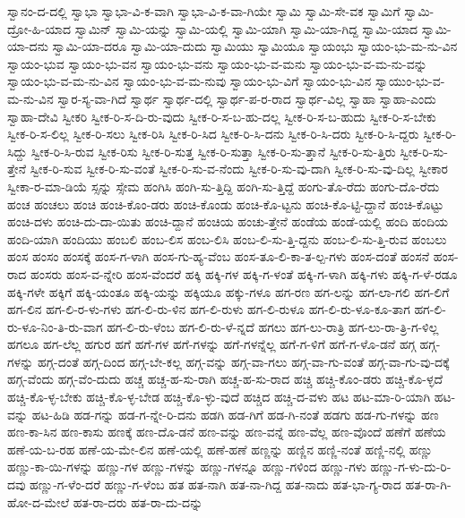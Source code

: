 {ಸ್ವಾನಂ-ದ-ದಲ್ಲಿ
ಸ್ವಾಭಾ
ಸ್ವಾಭಾ-ವಿ-ಕ-ವಾಗಿ
ಸ್ವಾಭಾ-ವಿ-ಕ-ವಾ-ಗಿಯೇ
ಸ್ವಾಮಿ
ಸ್ವಾಮಿ-ಸೇ-ವಕ
ಸ್ವಾಮಿಗೆ
ಸ್ವಾಮಿ-ದ್ರೋ-ಹಿ-ಯಾದ
ಸ್ವಾಮಿನ್
ಸ್ವಾಮಿ-ಯನ್ನು
ಸ್ವಾಮಿ-ಯಲ್ಲಿ
ಸ್ವಾಮಿ-ಯಾಗಿ
ಸ್ವಾಮಿ-ಯಾ-ಗಿದ್ದ
ಸ್ವಾಮಿ-ಯಾದ
ಸ್ವಾಮಿ-ಯಾ-ದನು
ಸ್ವಾಮಿ-ಯಾ-ದರೂ
ಸ್ವಾಮಿ-ಯಾ-ದುದು
ಸ್ವಾಮಿಯು
ಸ್ವಾಮಿಯೂ
ಸ್ವಾಯಂಭು
ಸ್ವಾಯಂ-ಭು-ಮ-ನು-ವಿನ
ಸ್ವಾಯಂ-ಭುವ
ಸ್ವಾಯಂ-ಭು-ವನ
ಸ್ವಾಯಂ-ಭು-ವನು
ಸ್ವಾಯಂ-ಭು-ವ-ಮನು
ಸ್ವಾಯಂ-ಭು-ವ-ಮ-ನು-ವನ್ನು
ಸ್ವಾಯಂ-ಭು-ವ-ಮ-ನು-ವಿನ
ಸ್ವಾಯಂ-ಭು-ವ-ಮ-ನುವು
ಸ್ವಾಯಂ-ಭು-ವಿಗೆ
ಸ್ವಾಯಂ-ಭು-ವಿನ
ಸ್ವಾಯುಂ-ಭು-ವ-ಮ-ನು-ವಿನ
ಸ್ವಾರ-ಸ್ಯ-ವಾ-ಗಿದೆ
ಸ್ವಾರ್ಥ
ಸ್ವಾರ್ಥ-ದಲ್ಲಿ
ಸ್ವಾರ್ಥ-ಪ-ರ-ರಾದ
ಸ್ವಾರ್ಥ-ವಿಲ್ಲ
ಸ್ವಾಹಾ
ಸ್ವಾಹಾ-ಎಂದು
ಸ್ವಾಹಾ-ದೇವಿ
ಸ್ವೀಕರಿ
ಸ್ವೀಕ-ರಿ-ಸ-ದಿ-ರು-ವುದು
ಸ್ವೀಕ-ರಿ-ಸ-ಬ-ಹು-ದಲ್ಲ
ಸ್ವೀಕ-ರಿ-ಸ-ಬ-ಹುದು
ಸ್ವೀಕ-ರಿ-ಸ-ಬೇಕು
ಸ್ವೀಕ-ರಿ-ಸ-ಲಿಲ್ಲ
ಸ್ವೀಕ-ರಿ-ಸಲು
ಸ್ವೀಕ-ರಿಸಿ
ಸ್ವೀಕ-ರಿ-ಸಿದ
ಸ್ವೀಕ-ರಿ-ಸಿ-ದನು
ಸ್ವೀಕ-ರಿ-ಸಿ-ದರು
ಸ್ವೀಕ-ರಿ-ಸಿ-ದ್ದರು
ಸ್ವೀಕ-ರಿ-ಸಿದ್ದು
ಸ್ವೀಕ-ರಿ-ಸಿ-ರುವ
ಸ್ವೀಕ-ರಿಸು
ಸ್ವೀಕ-ರಿ-ಸುತ್ತ
ಸ್ವೀಕ-ರಿ-ಸುತ್ತಾ
ಸ್ವೀಕ-ರಿ-ಸು-ತ್ತಾನೆ
ಸ್ವೀಕ-ರಿ-ಸು-ತ್ತಿರು
ಸ್ವೀಕ-ರಿ-ಸು-ತ್ತೇನೆ
ಸ್ವೀಕ-ರಿ-ಸುವ
ಸ್ವೀಕ-ರಿ-ಸು-ವಂತೆ
ಸ್ವೀಕ-ರಿ-ಸು-ವ-ನೆಂದು
ಸ್ವೀಕ-ರಿ-ಸು-ವು-ದಾಗಿ
ಸ್ವೀಕ-ರಿ-ಸು-ವು-ದಿಲ್ಲ
ಸ್ವೀಕಾರ
ಸ್ವೀಕಾ-ರ-ಮಾ-ಡಿಯೆ
ಸ್ಸನ್ನು
ಸ್ಸೇಮ
ಹಂಗಿಸಿ
ಹಂಗಿ-ಸು-ತ್ತಿದ್ದಿ
ಹಂಗಿ-ಸು-ತ್ತಿದ್ದೆ
ಹಂಗು-ತೊ-ರೆದು
ಹಂಗು-ದೊ-ರೆದು
ಹಂಚ
ಹಂಚಲು
ಹಂಚಿ
ಹಂಚಿ-ಕೊಂ-ಡರು
ಹಂಚಿ-ಕೊಂಡು
ಹಂಚಿ-ಕೊ-ಟ್ಟನು
ಹಂಚಿ-ಕೊ-ಟ್ಟಿ-ದ್ದಾನೆ
ಹಂಚಿ-ಕೊಟ್ಟು
ಹಂಚಿ-ದಳು
ಹಂಚಿ-ದು-ದಾ-ಯಿತು
ಹಂಚಿ-ದ್ದಾನೆ
ಹಂಚಿಯ
ಹಂಚು-ತ್ತೇನೆ
ಹಂಡೆಯ
ಹಂಡೆ-ಯಲ್ಲಿ
ಹಂದಿ
ಹಂದಿಯ
ಹಂದಿ-ಯಾಗಿ
ಹಂದಿಯು
ಹಂಬಲಿ
ಹಂಬ-ಲಿಸ
ಹಂಬ-ಲಿಸಿ
ಹಂಬ-ಲಿ-ಸು-ತ್ತಿ-ದ್ದನು
ಹಂಬ-ಲಿ-ಸು-ತ್ತಿ-ರುವ
ಹಂಬಲು
ಹಂಸ
ಹಂಸಂ
ಹಂಸಕ್ಕೆ
ಹಂಸ-ಗ-ಳಾಗಿ
ಹಂಸ-ಗು-ಹ್ಯ-ವೆಂಬ
ಹಂಸ-ತೂ-ಲಿ-ಕಾ-ತ-ಲ್ಪ-ಗಳು
ಹಂಸ-ದಂತೆ
ಹಂಸನೆ
ಹಂಸ-ರಾದ
ಹಂಸರು
ಹಂಸ-ವ-ನ್ನೇರಿ
ಹಂಸ-ವೆಂದರೆ
ಹಕ್ಕಿ
ಹಕ್ಕಿ-ಗಳ
ಹಕ್ಕಿ-ಗ-ಳಂತೆ
ಹಕ್ಕಿ-ಗ-ಳಾಗಿ
ಹಕ್ಕಿ-ಗಳು
ಹಕ್ಕಿ-ಗ-ಳೆ-ರಡೂ
ಹಕ್ಕಿ-ಗಳೇ
ಹಕ್ಕಿಗೆ
ಹಕ್ಕಿ-ಯಂತೂ
ಹಕ್ಕಿ-ಯನ್ನು
ಹಕ್ಕಿಯೂ
ಹಕ್ಕು-ಗಳೂ
ಹಗ-ರಣ
ಹಗ-ಲನ್ನು
ಹಗ-ಲಾ-ಗಲಿ
ಹಗ-ಲಿಗೆ
ಹಗ-ಲಿನ
ಹಗ-ಲಿ-ರ-ಳು-ಗಳು
ಹಗ-ಲಿ-ರು-ಳಿನ
ಹಗ-ಲಿ-ರುಳು
ಹಗ-ಲಿ-ರುಳೂ
ಹಗ-ಲಿ-ರು-ಳೂ-ಕೂ-ತಾಗ
ಹಗ-ಲಿ-ರು-ಳೂ-ನಿಂ-ತಿ-ರು-ವಾಗ
ಹಗ-ಲಿ-ರು-ಳೆಂಬ
ಹಗ-ಲಿ-ರು-ಳೆ-ನ್ನದೆ
ಹಗಲು
ಹಗ-ಲು-ರಾತ್ರಿ
ಹಗ-ಲು-ರಾ-ತ್ರಿ-ಗ-ಳಿಲ್ಲ
ಹಗಲೂ
ಹಗ-ಲೆಲ್ಲ
ಹಗುರ
ಹಗೆ
ಹಗೆ-ಗಳ
ಹಗೆ-ಗಳನ್ನು
ಹಗೆ-ಗಳನ್ನೆಲ್ಲ
ಹಗೆ-ಗ-ಳಿಗೆ
ಹಗೆ-ಗ-ಳೊ-ಡನೆ
ಹಗ್ಗ
ಹಗ್ಗ-ಗಳನ್ನು
ಹಗ್ಗ-ದಂತೆ
ಹಗ್ಗ-ದಿಂದ
ಹಗ್ಗ-ಬೇ-ಕಲ್ಲ
ಹಗ್ಗ-ವನ್ನು
ಹಗ್ಗ-ವಾ-ಗಲು
ಹಗ್ಗ-ವಾ-ಗು-ವಂತೆ
ಹಗ್ಗ-ವಾ-ಗು-ವು-ದಕ್ಕೆ
ಹಗ್ಗ-ವೆಂದು
ಹಗ್ಗ-ವೆಂ-ದುದು
ಹಚ್ಚ
ಹಚ್ಚ-ಹ-ಸು-ರಾಗಿ
ಹಚ್ಚ-ಹ-ಸು-ರಾದ
ಹಚ್ಚಿ
ಹಚ್ಚಿ-ಕೊಂ-ಡರು
ಹಚ್ಚಿ-ಕೊ-ಳ್ಳದೆ
ಹಚ್ಚಿ-ಕೊ-ಳ್ಳ-ಬೇಕು
ಹಚ್ಚಿ-ಕೊ-ಳ್ಳ-ಬೇಡ
ಹಚ್ಚಿ-ಕೊ-ಳ್ಳು-ವುದೆ
ಹಚ್ಚಿದ
ಹಚ್ಚಿ-ದ-ವಳು
ಹಟ
ಹಟ-ಮಾ-ರಿ-ಯಾಗಿ
ಹಟ-ವನ್ನು
ಹಟ-ಹಿಡಿ
ಹಡ-ಗನ್ನು
ಹಡ-ಗ-ನ್ನೇ-ರಿ-ದನು
ಹಡಗಿ
ಹಡ-ಗಿಗೆ
ಹಡ-ಗಿ-ನಂತೆ
ಹಡಗು
ಹಡ-ಗು-ಗಳನ್ನು
ಹಣ
ಹಣ-ಕಾ-ಸಿನ
ಹಣ-ಕಾಸು
ಹಣಕ್ಕೆ
ಹಣ-ದೊ-ಡನೆ
ಹಣ-ವನ್ನು
ಹಣ-ವನ್ನೆ
ಹಣ-ವೆಲ್ಲ
ಹಣ-ವೊಂದೆ
ಹಣೆಗೆ
ಹಣೆಯ
ಹಣೆ-ಯ-ಬ-ರಹ
ಹಣೆ-ಯ-ಮೇ-ಲಿನ
ಹಣೆ-ಯಲ್ಲಿ
ಹಣೆ-ಹಣೆ
ಹಣ್ಣನ್ನು
ಹಣ್ಣಿನ
ಹಣ್ಣಿ-ನಂತೆ
ಹಣ್ಣಿ-ನಲ್ಲಿ
ಹಣ್ಣು
ಹಣ್ಣು-ಕಾ-ಯಿ-ಗಳನ್ನು
ಹಣ್ಣು-ಗಳ
ಹಣ್ಣು-ಗಳನ್ನು
ಹಣ್ಣು-ಗಳನ್ನೂ
ಹಣ್ಣು-ಗಳಿಂದ
ಹಣ್ಣು-ಗಳು
ಹಣ್ಣು-ಗ-ಳು-ದು-ರಿ-ದವು
ಹಣ್ಣು-ಗ-ಳೆಂ-ದರೆ
ಹಣ್ಣು-ಗ-ಳೆಂಬ
ಹತ
ಹತ-ನಾಗಿ
ಹತ-ನಾ-ಗಿದ್ದ
ಹತ-ನಾದು
ಹತ-ಭಾ-ಗ್ಯ-ರಾದ
ಹತ-ರಾ-ಗಿ-ಹೋ-ದ-ಮೇಲೆ
ಹತ-ರಾ-ದರು
ಹತ-ರಾ-ದು-ದನ್ನು
}
